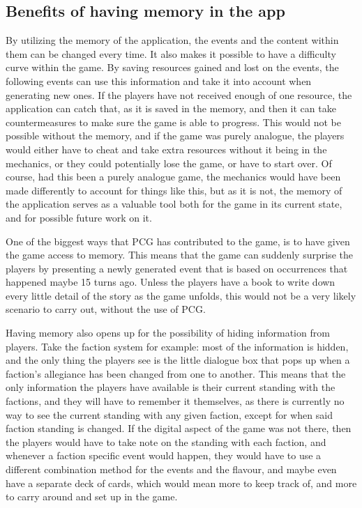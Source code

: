\subsection{Benefits of having memory in the app}
By utilizing the memory of the application, the events and the content within them can be changed every time. It also makes it possible to have a difficulty curve within the game. By saving resources gained and lost on the events, the following events can use this information and take it into account when generating new ones. If the players have not received enough of one resource, the application can catch that, as it is saved in the memory, and then it can take countermeasures to make sure the game is able to progress. This would not be possible without the memory, and if the game was purely analogue, the players would either have to cheat and take extra resources without it being in the mechanics, or they could potentially lose the game, or have to start over. Of course, had this been a purely analogue game, the mechanics would have been made differently to account for things like this, but as it is not, the memory of the application serves as a valuable tool both for the game in its current state, and for possible future work on it.


One of the biggest ways that PCG has contributed to the game, is to have given the game access to memory. This means that the game can suddenly surprise the players by presenting a newly generated event that is based on occurrences that happened maybe 15 turns ago. Unless the players have a book to write down every little detail of the story as the game unfolds, this would not be a very likely scenario to carry out, without the use of PCG. 

Having memory also opens up for the possibility of hiding information from players. Take the faction system for example: most of the information is hidden, and the only thing the players see is the little dialogue box that pops up when a faction's allegiance has been changed from one to another. This means that the only information the players have available is their current standing with the factions, and they will have to remember it themselves, as there is currently no way to see the current standing with any given faction, except for when said faction standing is changed. If the digital aspect of the game was not there, then the players would have to take note on the standing with each faction, and whenever a faction specific event would happen, they would have to use a different combination method for the events and the flavour, and maybe even have a separate deck of cards, which would mean more to keep track of, and more to carry around and set up in the game.


